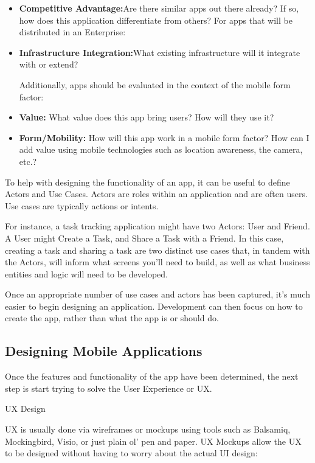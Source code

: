 \begin{itemize}


 \item \textbf{Competitive Advantage:}Are there similar apps out there already? If so, how does this application differentiate from others?
For apps that will be distributed in an Enterprise:

\item \textbf{Infrastructure Integration:}What existing infrastructure will it integrate with or extend?


 Additionally, apps should be evaluated in the context of the mobile form factor:

 \item \textbf{Value:}  What value does this app bring users? How will they use it?
 \item \textbf{Form/Mobility:} How will this app work in a mobile form factor? How can I add value using mobile technologies such as location awareness, the camera, etc.?


\end{itemize}

To help with designing the functionality of an app, it can be useful to define Actors and Use Cases. Actors are roles within an application and are often users. Use cases are typically actions or intents.

For instance, a task tracking application might have two Actors: User and Friend. A User might Create a Task, and Share a Task with a Friend. In this case, creating a task and sharing a task are two distinct use cases that, in tandem with the Actors, will inform what screens you’ll need to build, as well as what business entities and logic will need to be developed.

Once an appropriate number of use cases and actors has been captured, it’s much easier to begin designing an application. Development can then focus on how to create the app, rather than what the app is or should do.

\subsection{Designing Mobile Applications}

Once the features and functionality of the app have been determined, the next step is start trying to solve the User Experience or UX.


UX Design

UX is usually done via wireframes or mockups using tools such as Balsamiq, Mockingbird, Visio, or just plain ol’ pen and paper. UX Mockups allow the UX to be designed without having to worry about the actual UI design:

